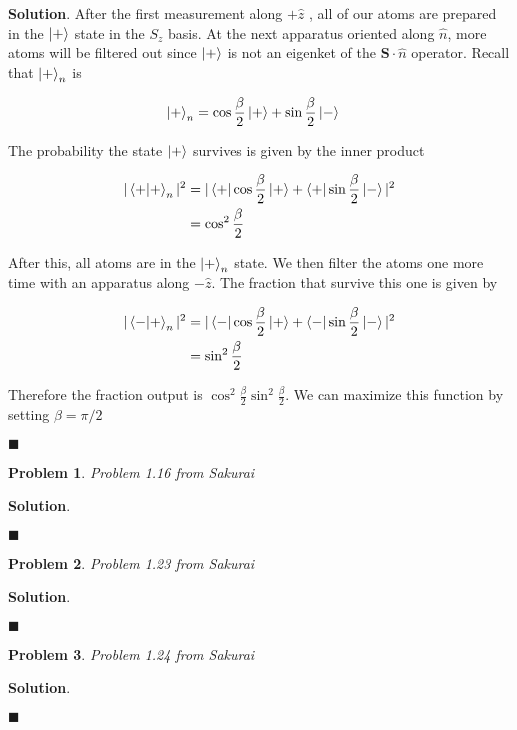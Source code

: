 \documentclass[12pt]{article}
\newtheorem{p}{Problem}
\theoremstyle{definition}
\newenvironment{s}{%
        \begin{trivlist} \item \textbf{Solution}. }{%
            \hspace*{\fill} $\blacksquare$\end{trivlist}}%
\begin{document}
{\begin{s} 
After the first measurement along $+\hat{z}$ , all of our atoms are prepared in the $\ket{+}$ state in the $S_{z}$ basis. At the next apparatus oriented along $\hat{n}$, more atoms will be filtered out since $\ket{+}$ is not an eigenket of the $\mathbf{S}\cdot \hat{n}$ operator. Recall that $\ket{+}_{n}$ is 

\begin{align*}
\ket{+}_{n} &= \cos\frac{\beta}{2}\ket{+} + \sin\frac{\beta}{2}\ket{-}
\end{align*}

The probability the state $\ket{+}$ survives is given by the inner product

\begin{align*}
|\bra{+}\ket{+}_{n}|^{2} &= |\bra{+}\cos\frac{\beta}{2}\ket{+} + \bra{+}\sin\frac{\beta}{2}\ket{-}|^{2}\\
&= \cos^{2}\frac{\beta}{2}
\end{align*}

After this, all atoms are in the $\ket{+}_{n}$ state. We then filter the atoms one more time with an apparatus along $-\hat{z}$. The fraction that survive this one is given by

\begin{align*}
|\bra{-}\ket{+}_{n}|^{2} &= |\bra{-}\cos\frac{\beta}{2}\ket{+} + \bra{-}\sin\frac{\beta}{2}\ket{-}|^{2}\\
&= \sin^{2}\frac{\beta}{2}
\end{align*}

Therefore the fraction output is $\cos^{2}\frac{\beta}{2}\sin^{2}\frac{\beta}{2}$. We can maximize this function by setting $\beta = \pi/2$

\end{s}

\begin{p}
Problem 1.16 from Sakurai
\end{p}

\begin{s} 

\end{s}

\begin{p}
Problem 1.23 from Sakurai
\end{p}

\begin{s} 

\end{s}

\begin{p}
Problem 1.24 from Sakurai
\end{p}

\begin{s} 

\end{s}
\end{document}
